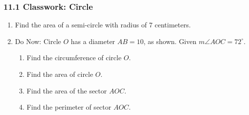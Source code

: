

\fancyhead[LE]{\thepage}



\subsubsection*{11.1 Classwork: Circle }
\begin{enumerate}
\item Find the area of a semi-circle with radius of 7 centimeters. \vspace{2cm}

\item Do Now: Circle $O$ has a diameter $AB=10$, as shown. Given $m\angle AOC=72^\circ$. 
\begin{multicols}{2}
  \raggedcolumns
  \begin{enumerate}[itemsep=1.5cm]
    \item Find the circumference of circle $O$.
    \item Find the area of circle $O$. 
    \item Find the area of the sector $AOC$. 
    \item Find the perimeter of sector $AOC$.
  \end{enumerate}
  \begin{center}
  \end{center}
\end{multicols} \vspace{1cm}


\end{enumerate}
